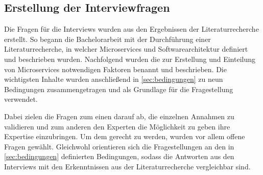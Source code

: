 \subsection{Erstellung der Interviewfragen}

Die Fragen für die Interviews wurden aus den Ergebnissen der Literaturrecherche erstellt. So begann die Bachelorarbeit mit der Durchführung einer Literaturrecherche, in welcher Microservices und Softwarearchitektur definiert und beschrieben wurden. Nachfolgend wurden die zur Erstellung und Einteilung von Microservices notwendigen Faktoren benannt und beschrieben.  Die wichtigsten Inhalte wurden anschließend in \cref{sec:bedingungen} zu neun Bedingungen zusammengetragen und als Grundlage für die Fragestellung verwendet.

Dabei zielen die Fragen zum einen darauf ab, die einzelnen Annahmen zu validieren und zum anderen den Experten die Möglichkeit zu geben ihre Expertise einzubringen. Um dem gerecht zu werden, wurden vor allem offene Fragen gewählt. Gleichwohl orientieren sich die Fragestellungen an den in \cref{sec:bedingungen} definierten Bedingungen, sodass die Antworten aus den Interviews mit den Erkenntnissen aus der Literaturrecherche vergleichbar sind.